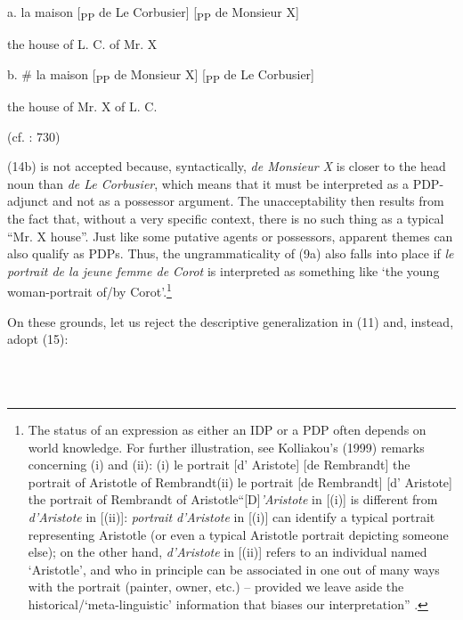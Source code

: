 \documentclass[output=paper]{langsci/langscibook}
\begin{document}
\ea%
    \label{ex:key:14}
    \gll\\
        \\
    \glt
    \z

            a.  la   maison  [\textsubscript{PP}   de  Le Corbusier]  [\textsubscript{PP}  de  Monsieur X] 

    the  house      of  L. C.        of  Mr. X

  b.     \#  la  maison [\textsubscript{PP}  de Monsieur X] [\textsubscript{PP}  de Le Corbusier]    

     the  house    of Mr. X    of L. C.

    (cf. \citealt{Kolliakou1999}: 730)

(14b) is not accepted because, syntactically, \textit{de Monsieur X} is closer to the head noun than \textit{de Le Corbusier}, which means that it must be interpreted as a PDP-adjunct and not as a possessor argument. The unacceptability then results from the fact that, without a very specific context, there is no such thing as a typical “Mr. X house”. Just like some putative agents or possessors, apparent themes can also qualify as PDPs. Thus, the ungrammaticality of (9a) also falls into place if \textit{le portrait de la jeune femme de Corot} is interpreted as something like ‘the young woman-portrait of/by Corot’.\footnote{The status of an expression as either an IDP or a PDP often depends on world knowledge. For further illustration, see Kolliakou’s (1999) remarks concerning (i) and (ii): (i)    le  portrait  [d’  Aristote]  [de  Rembrandt]    the  portrait  of  Aristotle  of  Rembrandt(ii)    le  portrait  [de  Rembrandt]  [d’  Aristote]    the  portrait  of  Rembrandt  of  Aristotle“[D]\textit{’Aristote} in [(i)] is different from \textit{d’Aristote} in [(ii)]: \textit{portrait} \textit{d’Aristot}\textit{e}\textbf{ }in [(i)] can identify a typical portrait representing Aristotle (or even a typical Aristotle portrait depicting someone else); on the other hand, \textit{d’Aristo}\textit{te} in [(ii)] refers to an individual named ‘Aristotle’, and who in principle can be associated in one out of many ways with the portrait (painter, owner, etc.) – provided we leave aside the historical/‘meta-linguistic’ information that biases our interpretation” \citep[748]{Kolliakou1999}.}

  On these grounds, let us reject the descriptive generalization in (11) and, instead, adopt (15):

\ea%
    \label{ex:key:15}
    \gll\\
        \\
    \glt
    \z
\end{document}
